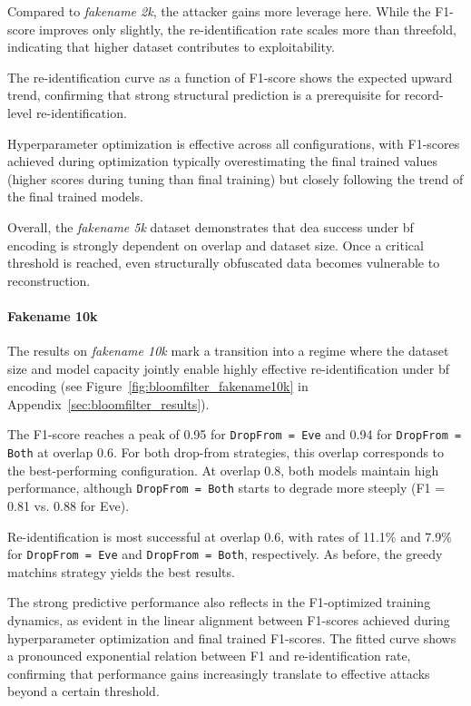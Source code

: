 Compared to \textit{fakename 2k}, the attacker gains more leverage here.
While the F1-score improves only slightly, the re-identification rate scales more than threefold, indicating that higher dataset contributes to exploitability.

The re-identification curve as a function of F1-score shows the expected upward trend, confirming that strong structural prediction is a prerequisite for record-level re-identification.

Hyperparameter optimization is effective across all configurations, with F1-scores achieved during optimization typically overestimating the final trained values (higher scores during tuning than final training) but closely following the trend of the final trained models.

Overall, the \textit{fakename 5k} dataset demonstrates that \ac{dea} success under \ac{bf} encoding is strongly dependent on overlap and dataset size.
Once a critical threshold is reached, even structurally obfuscated data becomes vulnerable to reconstruction.

\paragraph{Fakename 10k}

The results on \textit{fakename 10k} mark a transition into a regime where the dataset size and model capacity jointly enable highly effective re-identification under \ac{bf} encoding (see Figure~\ref{fig:bloomfilter_fakename10k} in Appendix~\ref{sec:bloomfilter_results}).

The F1-score reaches a peak of 0.95 for \texttt{DropFrom = Eve} and 0.94 for \texttt{DropFrom = Both} at overlap 0.6.
For both drop-from strategies, this overlap corresponds to the best-performing configuration.
At overlap 0.8, both models maintain high performance, although \texttt{DropFrom = Both} starts to degrade more steeply (F1 = 0.81 vs. 0.88 for Eve).

Re-identification is most successful at overlap 0.6, with rates of 11.1\% and 7.9\% for \texttt{DropFrom = Eve} and \texttt{DropFrom = Both}, respectively.
As before, the greedy matchins strategy yields the best results.

The strong predictive performance also reflects in the F1-optimized training dynamics, as evident in the linear alignment between F1-scores achieved during hyperparameter optimization and final trained F1-scores.
The fitted curve shows a pronounced exponential relation between F1 and re-identification rate, confirming that performance gains increasingly translate to effective attacks beyond a certain threshold.

